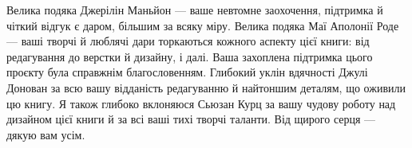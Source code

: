 Велика подяка Джерілін Маньйон — ваше невтомне заохочення, підтримка й чіткий відгук є даром, більшим за всяку міру. Велика подяка Маї Аполонії Роде — ваші творчі й люблячі дари торкаються кожного аспекту цієї книги: від редагування до верстки й дизайну, і далі. Ваша захоплена підтримка цього проєкту була справжнім благословенням. Глибокий уклін вдячності Джулі Донован за всю вашу відданість редагуванню й найтоншим деталям, що оживили цю книгу. Я також глибоко вклоняюся Сьюзан Курц за вашу чудову роботу над дизайном цієї книги й за всі ваші тихі творчі таланти. Від щирого серця — дякую вам усім.
